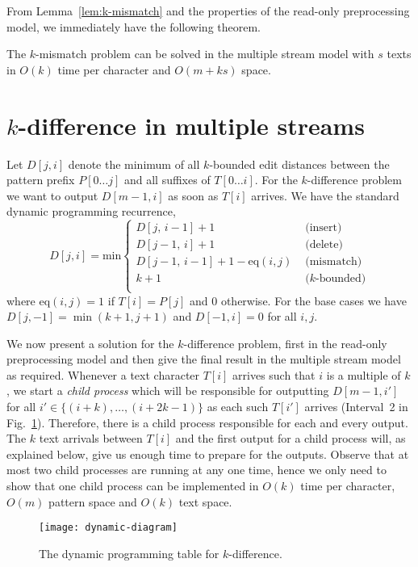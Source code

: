 \documentclass[envcountsame]{llncs}
\newcommand{\upto}{\ensuremath{\ldots}}
\begin{document}
From Lemma~\ref{lem:k-mismatch} and the properties of the read-only
preprocessing model, we immediately have the following theorem.

\begin{theorem}
    The $k$-mismatch problem can be solved in the multiple stream model with $s$ texts in $O(k)$ time per character and $O(m+ks)$ space.
\end{theorem}



\section{$k$-difference in multiple streams}\label{sec:k-diff}

Let $D[j,i]$ denote the minimum of all $k$-bounded edit distances between the pattern prefix $P[0\upto j]$ and all suffixes of $T[0\upto i]$. For the $k$-difference problem we want to output $D[m-1,i]$ as soon as $T[i]$ arrives. We have the standard dynamic programming recurrence,
\begin{equation*}
D[j,i] = \text{min} \left \lbrace
    \begin{array}{ll}
        D[j,\, i-1]+1 & \text{ (insert)}\\
        D[j-1,\, i]+1 & \text{ (delete)} \\
        D[j-1,\,i-1] + 1 - \text{eq}(i,j) & \text{ (mismatch)} \\
        k+1 & \text{ ($k$-bounded)}\\
    \end{array} \right.
\end{equation*}
where $\text{eq}(i,j)=1$ if $T[i]=P[j]$ and $0$ otherwise. For the base cases we have $D[j,-1]=\min(k+1,j+1)$ and $D[-1,i]=0$ for all $i,j$.

We now present a solution for the $k$-difference problem, first in
the read-only preprocessing model and then give the final result in
the multiple stream model as required.  Whenever a text character $T[i]$ arrives such that $i$ is a multiple of $k$, we start a \emph{child process} which will be responsible for outputting $D[m-1,i']$ for all $i'\in \{(i+k),\ldots,(i+2k-1)\}$ as each such $T[i']$ arrives (Interval~2 in Fig.~\ref{fig:dynamic}). Therefore, there is a child process responsible for each and every output. The $k$ text arrivals between $T[i]$ and the first output for a child process will, as explained below, give us enough time to prepare for the outputs. Observe that at most two child processes are running at any one time, hence we only need to show that one child process can be implemented in $O(k)$ time per character,  $O(m)$ pattern space and $O(k)$ text space.
\begin{figure}[ht]
    \hskip 45pt \texttt{[image: dynamic-diagram]}
    \caption{\label{fig:dynamic} The dynamic programming table for $k$-difference.}
\end{figure}
\end{document}
